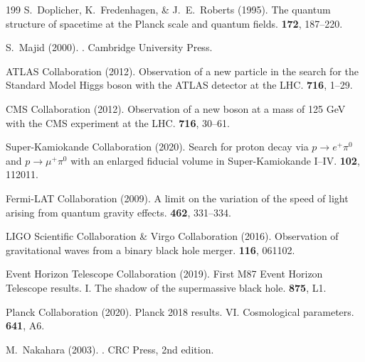 \documentclass[11pt,a4paper,openright]{book}
\theoremstyle{plain}
\theoremstyle{definition}
\begin{document}
\begin{thebibliography}{199}
S.~Doplicher, K.~Fredenhagen, \& J.~E.~Roberts (1995).
\newblock The quantum structure of spacetime at the Planck scale and quantum fields.
 {\bf 172}, 187--220.

S.~Majid (2000).
.
\newblock Cambridge University Press.


ATLAS Collaboration (2012).
\newblock Observation of a new particle in the search for the Standard Model Higgs boson with the ATLAS detector at the LHC.
 {\bf 716}, 1--29.

CMS Collaboration (2012).
\newblock Observation of a new boson at a mass of 125 GeV with the CMS experiment at the LHC.
 {\bf 716}, 30--61.

Super-Kamiokande Collaboration (2020).
\newblock Search for proton decay via $p \to e^+ \pi^0$ and $p \to \mu^+ \pi^0$ with an enlarged fiducial volume in Super-Kamiokande I--IV.
 {\bf 102}, 112011.

Fermi-LAT Collaboration (2009).
\newblock A limit on the variation of the speed of light arising from quantum gravity effects.
 {\bf 462}, 331--334.

LIGO Scientific Collaboration \& Virgo Collaboration (2016).
\newblock Observation of gravitational waves from a binary black hole merger.
 {\bf 116}, 061102.

Event Horizon Telescope Collaboration (2019).
\newblock First M87 Event Horizon Telescope results. I. The shadow of the supermassive black hole.
 {\bf 875}, L1.

Planck Collaboration (2020).
\newblock Planck 2018 results. VI. Cosmological parameters.
 {\bf 641}, A6.


M.~Nakahara (2003).
.
\newblock CRC Press, 2nd edition.


\end{thebibliography}
\end{document}
